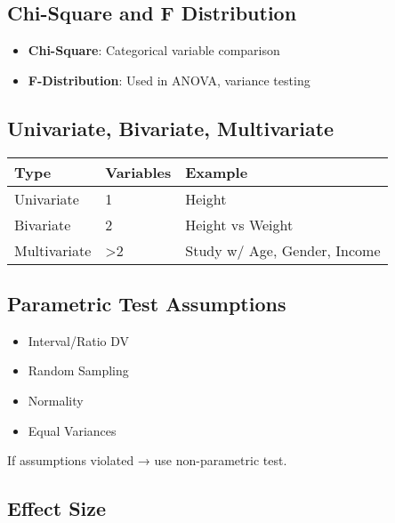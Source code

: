 \documentclass[
  letterpaper,
  DIV=11,
  numbers=noendperiod]{scrreprt}
\providecommand{\tightlist}{%
  \setlength{\itemsep}{0pt}\setlength{\parskip}{0pt}}
\begin{document}
\subsection{Chi-Square and F
Distribution}\label{chi-square-and-f-distribution}

\begin{itemize}
\tightlist
\item
  \textbf{Chi-Square}: Categorical variable comparison\\
\item
  \textbf{F-Distribution}: Used in ANOVA, variance testing
\end{itemize}

\subsection{Univariate, Bivariate,
Multivariate}\label{univariate-bivariate-multivariate}

\begin{longtable}[]{@{}lll@{}}
\toprule\noalign{}
Type & Variables & Example \\
\midrule\noalign{}
\endhead
\bottomrule\noalign{}
\endlastfoot
Univariate & 1 & Height \\
Bivariate & 2 & Height vs Weight \\
Multivariate & \textgreater2 & Study w/ Age, Gender, Income \\
\end{longtable}

\subsection{Parametric Test
Assumptions}\label{parametric-test-assumptions}

\begin{itemize}
\tightlist
\item
  Interval/Ratio DV\\
\item
  Random Sampling\\
\item
  Normality\\
\item
  Equal Variances
\end{itemize}

If assumptions violated → use non-parametric test.

\subsection{Effect Size}\label{effect-size}
\end{document}
